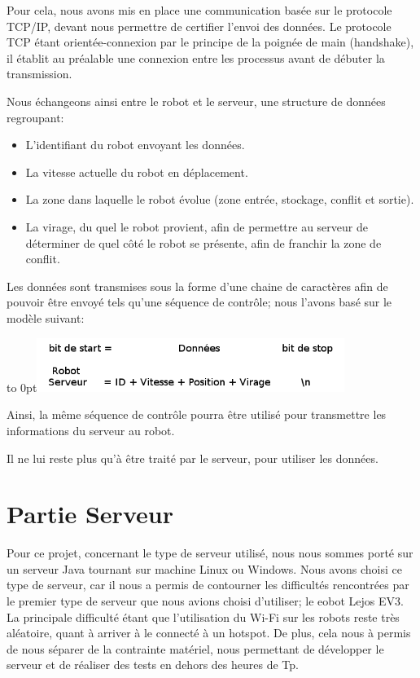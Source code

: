 \documentclass[french,a4paper,12pt]{report}
\begin{document}
Pour cela, nous avons mis en place une communication basée sur le protocole TCP/IP, devant nous permettre de certifier l'envoi des données. Le protocole TCP étant orientée-connexion par le principe de la poignée de main (handshake), il établit au préalable une connexion entre les processus avant de débuter la transmission.

Nous échangeons ainsi entre le robot et le serveur, une structure de données regroupant:
  \begin{itemize}
  \item L'identifiant du robot envoyant les données.
  \item La vitesse actuelle du robot en déplacement.
  \item La zone dans laquelle le robot évolue (zone entrée, stockage, conflit et sortie).
  \item La virage, du quel le robot provient, afin de permettre au serveur de déterminer de quel côté le robot se présente, afin de franchir la zone de conflit.
  \end{itemize}
  
Les données sont transmises sous la forme d'une chaine de caractères afin de pouvoir être envoyé tels qu'une séquence de contrôle; nous l'avons basé sur le modèle suivant:

\hfill\hbox to 0pt{\hss\includegraphics[width=10cm]{sequ.png}\hss}\hfill\null\newline

Ainsi, la même séquence de contrôle pourra être utilisé pour transmettre les informations du serveur au robot.

Il ne lui reste plus qu'à être traité par le serveur, pour utiliser les données.

\section{Partie Serveur}%

Pour ce projet, concernant le type de serveur utilisé, nous nous sommes porté sur un serveur Java tournant sur machine Linux ou Windows.
Nous avons choisi ce type de serveur, car il nous a permis de contourner les difficultés rencontrées par le premier type de serveur que nous avions choisi d'utiliser; le eobot Lejos EV3.
La principale difficulté étant que l'utilisation du Wi-Fi sur les robots reste très aléatoire, quant à arriver à le connecté à un hotspot. De plus, cela nous à permis de nous séparer de la contrainte matériel, nous permettant de développer le serveur et de réaliser des tests en dehors des heures de Tp.
\end{document}
